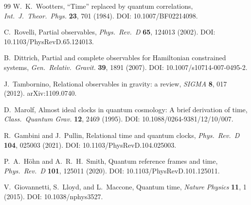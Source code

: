 \documentclass[11pt, a4paper]{article}
\theoremstyle{definition}
\theoremstyle{plain}
\theoremstyle{remark}
\numberwithin{equation}{section}
\begin{document}
\begin{thebibliography}{99}
            W.~K.~Wootters,
            ``Time'' replaced by quantum correlations,
            \textit{Int.\ J.\ Theor.\ Phys.} \textbf{23}, 701 (1984).
            DOI: 10.1007/BF02214098.
            
            C.~Rovelli,
            Partial observables,
            \textit{Phys.\ Rev.\ D} \textbf{65}, 124013 (2002).
            DOI: 10.1103/PhysRevD.65.124013.
            
            B.~Dittrich,
            Partial and complete observables for Hamiltonian constrained systems,
            \textit{Gen.\ Relativ.\ Gravit.} \textbf{39}, 1891 (2007).
            DOI: 10.1007/s10714-007-0495-2.
            
            J.~Tambornino,
            Relational observables in gravity: a review,
            \textit{SIGMA} \textbf{8}, 017 (2012).
            arXiv:1109.0740.
            
            D.~Marolf,
            Almost ideal clocks in quantum cosmology: A brief derivation of time,
            \textit{Class.\ Quantum Grav.} \textbf{12}, 2469 (1995).
            DOI: 10.1088/0264-9381/12/10/007.
            
            R.~Gambini and J.~Pullin,
            Relational time and quantum clocks,
            \textit{Phys.\ Rev.\ D} \textbf{104}, 025003 (2021).
            DOI: 10.1103/PhysRevD.104.025003.
            
            P.~A.~H{\"o}hn and A.~R.~H.~Smith,
            Quantum reference frames and time,
            \textit{Phys.\ Rev.\ D} \textbf{101}, 125011 (2020).
            DOI: 10.1103/PhysRevD.101.125011.
            
            V.~Giovannetti, S.~Lloyd, and L.~Maccone,
            Quantum time,
            \textit{Nature Physics} \textbf{11}, 1 (2015).
            DOI: 10.1038/nphys3527.
        
        \end{thebibliography}
\end{document}
